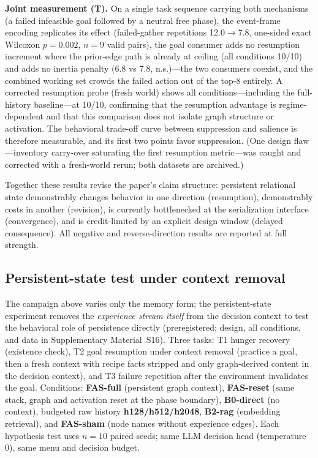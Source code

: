 \documentclass[10pt]{article}
\begin{document}
\textbf{Joint measurement (T).} On a single task sequence carrying
both mechanisms (a failed infeasible goal followed by a neutral free
phase), the event-frame encoding replicates its effect
(failed-gather repetitions 12.0$\rightarrow$7.8, one-sided exact
Wilcoxon $p{=}0.002$, $n{=}9$ valid pairs), the goal consumer adds no resumption increment where the
prior-edge path is already at ceiling (all conditions 10/10) and adds
no inertia penalty (6.8 vs 7.8, n.s.)---the two consumers coexist, and
the combined working set crowds the failed action out of the top-8
entirely. A corrected resumption probe (fresh world) shows all
conditions---including the full-history baseline---at 10/10, confirming
that the resumption advantage is regime-dependent and that this
comparison does not isolate graph structure or activation.
The behavioral trade-off curve between suppression and
salience is therefore measurable, and its first two points favor
suppression. (One design flaw---inventory carry-over saturating the
first resumption metric---was caught and corrected with a fresh-world
rerun; both datasets are archived.)

Together these results revise the paper's claim structure: persistent
relational state demonstrably changes behavior in one direction
(resumption), demonstrably costs in another (revision), is currently
bottlenecked at the serialization interface (convergence), and is
credit-limited by an explicit design window (delayed consequence).
All negative and reverse-direction results are reported at full
strength.

\subsection{Persistent-state test under context removal}
\label{sec:res-psa}

The campaign above varies only the memory form; the persistent-state
experiment removes the \emph{experience stream itself} from the
decision context to test the behavioral role of persistence directly
(preregistered; design, all conditions, and data in Supplementary
Material~S16). Three tasks: T1 hunger recovery (existence check), T2
goal resumption under context removal (practice a goal, then a fresh
context with recipe facts stripped and only graph-derived content in
the decision context), and T3 failure repetition after the environment
invalidates the goal. Conditions: \textbf{FAS-full} (persistent graph
context), \textbf{FAS-reset} (same stack, graph and activation reset at
the phase boundary), \textbf{B0-direct} (no context), budgeted raw
history \textbf{h128/h512/h2048}, \textbf{B2-rag} (embedding
retrieval), and \textbf{FAS-sham} (node names without experience
edges). Each hypothesis test uses $n{=}10$ paired seeds; same LLM
decision head (temperature 0), same menu and decision budget.
\end{document}
